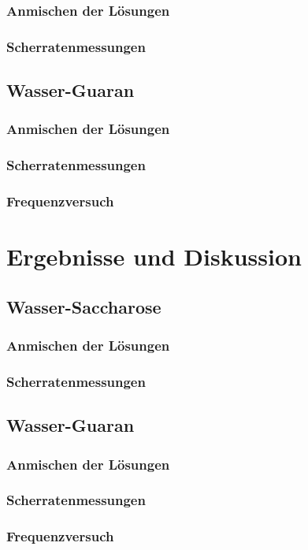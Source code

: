\documentclass[11pt,a4paper,oneside]{scrartcl}
\begin{document}
\subsubsection{Anmischen der Lösungen}
\subsubsection{Scherratenmessungen}
\subsection{Wasser-Guaran}
\subsubsection{Anmischen der Lösungen}
\subsubsection{Scherratenmessungen}
\subsubsection{Frequenzversuch}
\section{Ergebnisse und Diskussion}
\subsection{Wasser-Saccharose}
\subsubsection{Anmischen der Lösungen}
\subsubsection{Scherratenmessungen}
\subsection{Wasser-Guaran}
\subsubsection{Anmischen der Lösungen}
\subsubsection{Scherratenmessungen}
\subsubsection{Frequenzversuch}
\cite{versuchsanleitung}
\cite{Stadler2014}
\cite{Hellström_2015}
\end{document}
